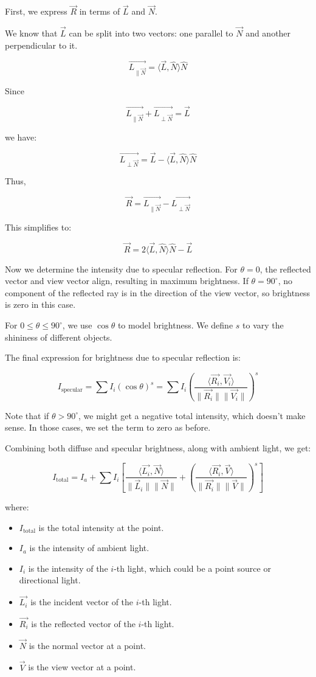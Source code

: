 \documentclass{article}
\begin{document}
First, we express $\vec{R}$ in terms of $\vec{L}$ and $\vec{N}$.

We know that $\vec{L}$ can be split into two vectors: one parallel to $\vec{N}$ and another perpendicular to it.

$$\vec{L_{\| \vec{N}}} = \langle \vec{L}, \hat{N} \rangle \hat{N}$$

Since 

$$\vec{L_{\| \vec{N}}} + \vec{L_{\perp \vec{N}}} = \vec{L}$$

we have:

$$\vec{L_{\perp \vec{N}}} = \vec{L} - \langle \vec{L}, \hat{N} \rangle \hat{N}$$

Thus,

$$\vec{R} = \vec{L_{\| \vec{N}}} - \vec{L_{\perp \vec{N}}}$$

This simplifies to:

$$\vec{R} = 2 \langle \vec{L}, \hat{N} \rangle \hat{N} - \vec{L}$$

Now we determine the intensity due to specular reflection. For $\theta = 0$, the reflected vector and view vector align, resulting in maximum brightness. If $\theta = 90^\circ$, no component of the reflected ray is in the direction of the view vector, so brightness is zero in this case.

For $0 \leq \theta \leq 90^\circ$, we use $\cos \theta$ to model brightness. We define $s$ to vary the shininess of different objects.

The final expression for brightness due to specular reflection is:

$$I_{\text{specular}} = \sum I_i (\cos \theta)^s = \sum I_i \left( \frac{\langle \vec{R_i}, \vec{V_i} \rangle}{\|\vec{R_i}\| \|\vec{V_i}\|} \right)^s$$

Note that if $\theta > 90^\circ$, we might get a negative total intensity, which doesn't make sense. In those cases, we set the term to zero as before.

Combining both diffuse and specular brightness, along with ambient light, we get:

$$I_{\text{total}} = I_a + \sum I_i \left[ \frac{\langle \vec{L_i}, \vec{N} \rangle}{\|\vec{L}_i\| \|\vec{N}\|} + \left( \frac{\langle \vec{R_i}, \vec{V} \rangle}{\|\vec{R_i}\| \|\vec{V}\|} \right)^s \right]$$

where:
\begin{itemize}
    \item $I_{\text{total}}$ is the total intensity at the point.
    \item $I_a$ is the intensity of ambient light.
    \item $I_i$ is the intensity of the $i$-th light, which could be a point source or directional light.
    \item $\vec{L_i}$ is the incident vector of the $i$-th light.
    \item $\vec{R_i}$ is the reflected vector of the $ i$-th light.
    \item $\vec{N}$ is the normal vector at a point.
    \item $\vec{V}$ is the view vector at a point.
\end{itemize}
\end{document}
